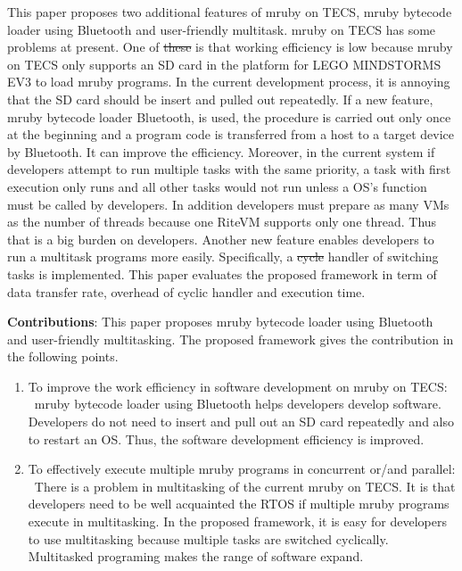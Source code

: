 \documentclass[conference,compsoc]{IEEEtran}
\providecommand{\DIFadd}[1]{{\protect\color{blue}\uwave{#1}}} %
\providecommand{\DIFdel}[1]{{\protect\color{red}\sout{#1}}}                      %
\providecommand{\DIFaddbegin}{} %
\providecommand{\DIFaddend}{} %
\providecommand{\DIFdelbegin}{} %
\providecommand{\DIFdelend}{} %
\begin{document}
This paper proposes two additional features of mruby on TECS, mruby bytecode loader using Bluetooth and user-friendly multitask.
mruby on TECS has some problems at present.
One of \DIFdelbegin \DIFdel{these }\DIFdelend \DIFaddbegin \DIFadd{the problems }\DIFaddend is that working efficiency is low because mruby on TECS only supports an SD card in the platform for LEGO MINDSTORMS EV3 \DIFaddbegin \DIFadd{\mbox{%
\cite{par:EV3} }%
}\DIFaddend to load mruby programs.
In the current development process, it is annoying that the SD card should be insert and pulled out repeatedly.
If a new feature, mruby bytecode loader Bluetooth, is used, the procedure is carried out only once at the beginning and a program code is transferred from a host to a target device by Bluetooth.
It can improve the efficiency.
Moreover, in the current system if developers attempt to run multiple tasks with the same priority, a task with first execution only runs and all other tasks would not run unless a OS's function must be called by developers.
In addition developers must prepare as many VMs as the number of threads because one RiteVM supports only one thread.
Thus that is a big burden on developers.
Another new feature enables developers to run a multitask programs more easily.
Specifically, a \DIFdelbegin \DIFdel{cycle }\DIFdelend \DIFaddbegin \DIFadd{cyclic }\DIFaddend handler of switching tasks is implemented.
This paper evaluates the proposed framework in term of data transfer rate, overhead of cyclic handler and execution time.

{\bf Contributions}: This paper proposes mruby bytecode loader using Bluetooth and user-friendly multitasking.
The proposed framework gives the contribution in the following points.
\begin{enumerate}
\item To improve the  work efficiency in software development on mruby on TECS: \mbox{}\\
\ mruby bytecode loader using Bluetooth helps developers develop software.
Developers do not need to insert and pull out an SD card repeatedly and also to restart an OS.
Thus, the software development efficiency is improved.
\item To effectively execute multiple mruby programs in concurrent or/and parallel: \mbox{}\\
\ There is a problem in multitasking of the current mruby on TECS.
It is that developers need to be well acquainted the RTOS if multiple mruby programs execute in multitasking.
In the proposed framework, it is easy for developers to use multitasking because multiple tasks are switched cyclically.
Multitasked programing makes the range of software expand.
\end{enumerate}
\end{document}
